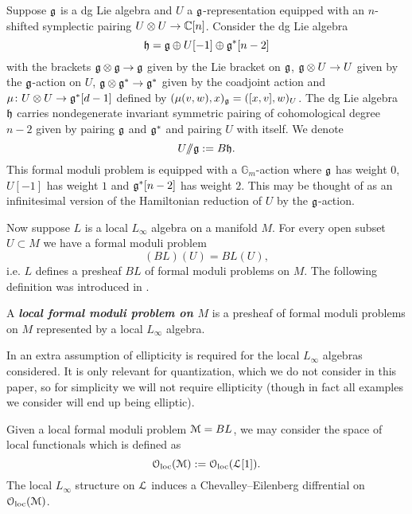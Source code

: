 \documentclass[10pt, oneside]{article}
\newcommand{\Gm}{\mathbb{G}_m}
\newcommand{\ham}{/\!\!/}
\newcommand{\defterm}[1]{\textbf{\emph{#1}}}
\begin{document}
\begin{example}
Suppose $\mathfrak g$ is a dg Lie algebra and $U$ a $\mathfrak g$-representation equipped with an $n$-shifted symplectic pairing $U\otimes U\rightarrow \mathbb C[n]$. Consider the dg Lie algebra
\[\mathfrak h = \mathfrak g\oplus U[-1]\oplus \mathfrak g^*[n-2]\]
with the brackets $\mathfrak g\otimes \mathfrak g\rightarrow \mathfrak g$ given by the Lie bracket on $\mathfrak g$, $\mathfrak g\otimes U\rightarrow U$ given by the $\mathfrak g$-action on $U$, $\mathfrak g\otimes \mathfrak g^*\rightarrow \mathfrak g^*$ given by the coadjoint action and $\mu\colon U\otimes U\rightarrow \mathfrak g^*[d-1]$ defined by $(\mu(v, w), x)_\mathfrak g = ([x, v], w)_U$. The dg Lie algebra $\mathfrak h$ carries nondegenerate invariant symmetric pairing of cohomological degree $n-2$ given by pairing $\mathfrak g$ and $\mathfrak g^*$ and pairing $U$ with itself. We denote
\[U\ham \fg := B\fh.\]
This formal moduli problem is equipped with a $\Gm$-action where $\mathfrak g$ has weight 0, $U[-1]$ has weight $1$ and $\mathfrak g^*[n-2]$ has weight $2$. This may be thought of as an infinitesimal version of the Hamiltonian reduction of $U$ by the $\mathfrak g$-action.
\end{example}

Now suppose $L$ is a local $L_\infty$ algebra on a manifold $M$. For every open subset $U\subset M$ we have a formal moduli problem
\[(B L)(U) = B L(U),\]
i.e. $L$ defines a presheaf $B L$ of formal moduli problems on $M$. The following definition was introduced in \cite[Definition 4.1.3.3]{Book2}.

\begin{definition}
A \defterm{local formal moduli problem on $M$} is a presheaf of formal moduli problems on $M$ represented by a local $L_\infty$ algebra.
\end{definition}

\begin{remark}
In \cite{Book2} an extra assumption of ellipticity is required for the local $L_\infty$ algebras considered. It is only relevant for quantization, which we do not consider in this paper, so for simplicity we will not require ellipticity (though in fact all examples we consider will end up being elliptic).
\end{remark}

Given a local formal moduli problem $\mathcal M=B L$, we may consider the space of local functionals which is defined as
\[\mathcal{O}_{\rm loc}(\mathcal M) := \mathcal{O}_{\rm loc}(\mathcal L[1]).\]
The local $L_\infty$ structure on $\mathcal L$ induces a Chevalley--Eilenberg diffrential on $\mathcal{O}_{\rm loc}(\mathcal M)$.
\end{document}
